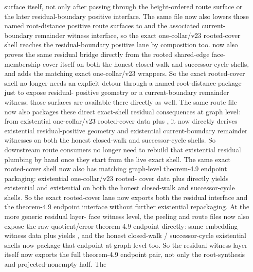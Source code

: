 \documentclass[11pt]{article}
\begin{document}
 surface itself, not
only after passing through the height-ordered route surface or the later
residual-boundary positive interface.  The same
file now also lowers those named
root-distance positive route surfaces to
 and the associated
current-boundary remainder witness interface, so the exact one-collar/v23
rooted-cover shell reaches the residual-boundary positive lane by composition
too.   now also proves the same
residual bridge directly from the rooted shared-edge face-membership cover
itself on both the honest closed-walk and successor-cycle shells, and
 adds the matching exact
one-collar/v23 wrappers.  So the exact rooted-cover shell no longer needs an
explicit detour through a named root-distance package just to expose residual-
positive geometry or a current-boundary remainder witness; those surfaces are
available there directly as well.  The same route file now also packages these
direct exact-shell residual consequences at graph level: from existential
one-collar/v23 rooted-cover data plus , it
now directly derives existential residual-positive geometry and existential
current-boundary remainder witnesses on both the honest closed-walk and
successor-cycle shells.  So downstream route consumers no longer need to
rebuild that existential residual plumbing by hand once they start from the
live exact shell.  The same exact rooted-cover shell now also has matching
graph-level theorem-4.9 endpoint packaging: existential one-collar/v23 rooted-
cover data plus  directly yields
existential  and
existential  on both the honest
closed-walk and successor-cycle shells.  So the exact rooted-cover lane now
exports both the residual interface and the theorem-4.9 endpoint interface
without further existential repackaging.  At the more generic residual layer-
face witness level, the peeling and route files now also expose the raw
quotient/error theorem-4.9 endpoint directly: same-embedding witness data plus
 yields
, and the honest closed-walk /
successor-cycle existential shells now package that endpoint at graph level
too.  So the residual witness layer itself now exports the full theorem-4.9
endpoint pair, not only the root-synthesis and projected-nonempty half.  The
\end{document}
